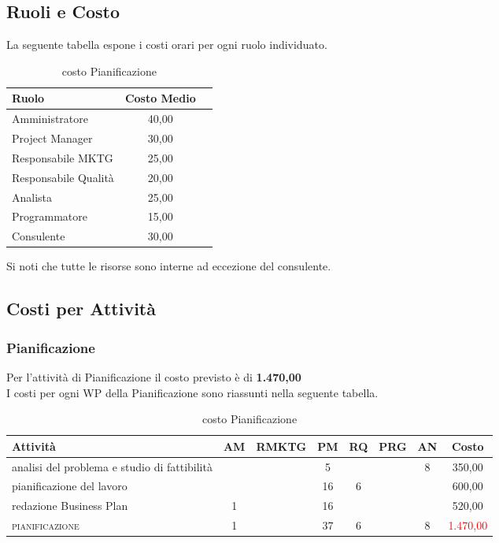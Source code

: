 \subsection{Ruoli e Costo }
La seguente tabella espone i costi orari per ogni ruolo individuato.
\begin{table}[!h]
\footnotesize
\centering
\begin{tabular}{|p{}|c|c|}
\hline
\textbf{Ruolo}& \textbf{Costo Medio} \\
\hline
Amministratore			& \text{\euro} 40,00\\
\hline
Project Manager			& \text{\euro} 30,00\\
\hline
Responsabile MKTG		& \text{\euro} 25,00\\
\hline
Responsabile Qualità	& \text{\euro} 20,00\\
\hline
Analista				& \text{\euro} 25,00\\
\hline
Programmatore			& \text{\euro} 15,00\\
\hline
Consulente				& \text{\euro} 30,00\\
  

\hline
\end{tabular}
\caption{costo Pianificazione}\label{tab:pianificazione}
\end{table}

Si noti che tutte le risorse sono interne ad eccezione del consulente. 

\subsection{Costi per Attività}

\subsubsection{Pianificazione}
Per l'attività di Pianificazione il costo previsto è di \textbf{ \text{\euro}1.470,00 }\\	
I costi per ogni WP della Pianificazione sono riassunti nella seguente tabella.
\begin{table}[!h]
\footnotesize
\centering
\begin{tabular}{|p{}|c|c|c|c|c|c|c|}
\hline
\textbf{Attività}& \textbf{AM} & \textbf{RMKTG} & \textbf{PM} & \textbf{RQ} & \textbf{PRG} & \textbf{AN} & \textbf{Costo}  \\
\hline
analisi del problema e studio di fattibilità  & & & 5& & & 8& \text{\euro} 350,00\\
pianificazione del lavoro	 				  & & &	16&	6& & & \text{\euro} 600,00 \\	
redazione Business Plan						& 1 & &16& & & &  	\text{\euro} 520,00 \\			  
\hline
\scshape{}pianificazione   							& 1 & &37 &	6 &	&	8 &	\textcolor{red}{ \text{\euro}1.470,00 }\\		 
\hline
\end{tabular}
\caption{costo Pianificazione}\label{tab:pianificazione}
\end{table}

